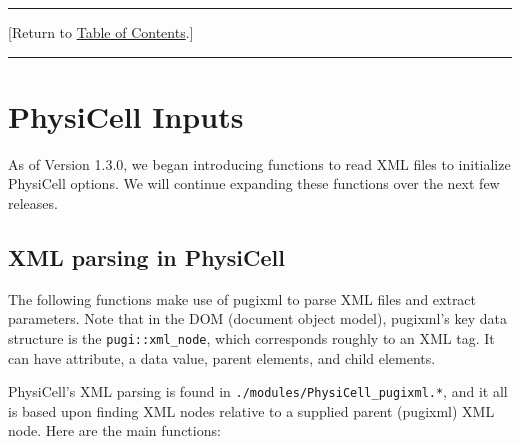 \documentclass[12pt]{article}
\renewcommand{\v}{\verb}
\newcommand{\TOClink}{\begin{center}\hrule\vskip-5pt\phantom{.}\hfill[Return to \hyperlink{TOC}{Table of Contents}.]\hfill\phantom{.}\vskip3pt\hrule\end{center}}
\begin{document}
\TOClink

\section{PhysiCell Inputs}
As of Version 1.3.0, we began introducing functions to read XML files to initialize 
PhysiCell options. We will continue expanding these functions over the next few 
releases. 

\subsection{XML parsing in PhysiCell}
\label{sec:XML}
The following functions make use of pugixml \cite{ref:pugixml} to parse XML files and 
extract parameters. Note that in the DOM (document object model), pugixml's key data 
structure is the \v|pugi::xml_node|, which corresponds roughly to an XML tag. It 
can have attribute, a data value, parent elements, and child elements. 

PhysiCell's XML parsing is found in \v|./modules/PhysiCell_pugixml.*|, and it all 
is based upon finding XML nodes relative to a supplied parent (pugixml) XML node. 
Here are the main functions: 
 
\end{document}
